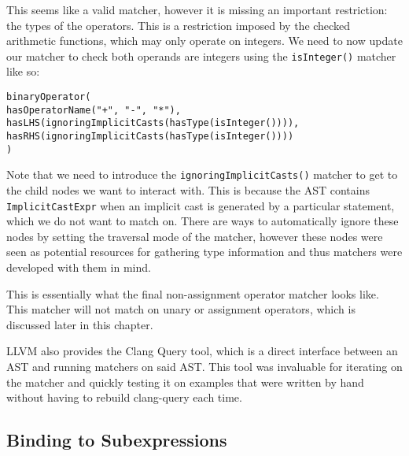This seems like a valid matcher, however it is missing an important restriction: the types of the operators. This is a restriction imposed by the checked arithmetic functions, which may only operate on integers. We need to now update our matcher to check both operands are integers using the \texttt{isInteger()} matcher like so:
\begin{center}
\parbox{0.9\linewidth}{
\texttt{binaryOperator(\\
\hspace*{4em}hasOperatorName("+", "-", "*"),\\
\hspace*{4em}hasLHS(ignoringImplicitCasts(hasType(isInteger()))),\\
\hspace*{4em}hasRHS(ignoringImplicitCasts(hasType(isInteger())))\\
)}
}
\end{center}

Note that we need to introduce the \texttt{ignoringImplicitCasts()} matcher to get to the child nodes we want to interact with. This is because the AST contains \texttt{ImplicitCastExpr} when an implicit cast is generated by a particular statement, which we do not want to match on. There are ways to automatically ignore these nodes by setting the traversal mode of the matcher, however these nodes were seen as potential resources for gathering type information and thus matchers were developed with them in mind.

This is essentially what the final non-assignment operator matcher looks like. This matcher will not match on unary or assignment operators, which is discussed later in this chapter.

LLVM also provides the Clang Query tool, which is a direct interface between an AST and running matchers on said AST. This tool was invaluable for iterating on the matcher and quickly testing it on examples that were written by hand without having to rebuild clang-query each time.

\subsection{Binding to Subexpressions}


